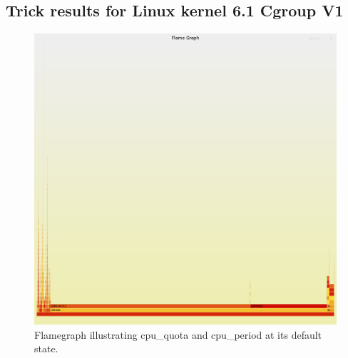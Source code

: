 \documentclass{report}  %
\begin{document}
\subsection{Trick results for Linux kernel 6.1 Cgroup V1}

\begin{figure}[H]
    \centering
    \includegraphics[scale=0.2]{cpu_tricks/6.1.0/V1/flamegraph_20241021_083704.png}
    \caption{Flamegraph illustrating cpu\_quota and cpu\_period at its default state.}
    \label{fig:flamegraph}
\end{figure}
\end{document}
